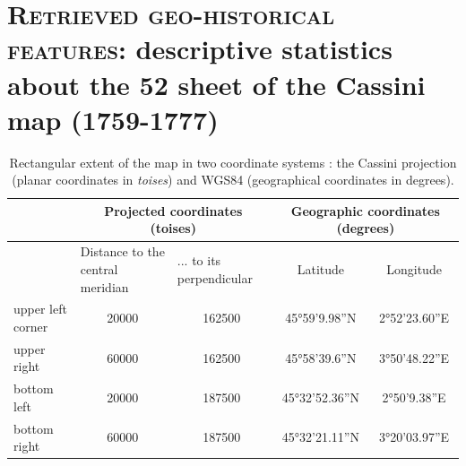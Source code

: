 \documentclass[portrait,a0]{sciposter}
\begin{document}
\vspace{-1cm}
\begin{minipage}[b]{\textwidth}
  \section{\normalfont \textsc{Retrieved geo-historical features}: descriptive statistics about the 52 sheet of the Cassini map (1759-1777)}
  \begin{multicols}{3}
    \setlength{\columnsep}{80pt}
    \footnotesize
    \begin{table}[]
      \begin{center}
        \captionsetup{type=table}
        \caption{Rectangular extent of the map in two coordinate systems : the Cassini projection (planar coordinates in \emph{toises}) and WGS84 (geographical coordinates in degrees).}
        \label{table:translation}
        \begin{tabular}{@{}lcccc@{}}
          \toprule
          & \multicolumn{2}{c}{Projected coordinates (toises)}                                                & \multicolumn{2}{c}{Geographic coordinates (degrees)}              \\
          \midrule
          & \multicolumn{1}{l}{Distance to the central meridian} & \multicolumn{1}{l}{... to its perpendicular} & \multicolumn{1}{c}{Latitude} & \multicolumn{1}{c}{Longitude} \\
          upper left corner & \num{20000}                                          & \num{162500}                                 & 45°59'9.98''N                & 2°52'23.60''E                 \\
          upper right       & \num{60000}                                          & \num{162500}                                 & 45°58'39.6''N                & 3°50'48.22''E                 \\
          bottom left      & \num{20000}                                        & \num{187500}                                & 45°32'52.36''N               & 2°50'9.38''E                  \\
          bottom right     & \num{60000}                                          & \num{187500}                                & 45°32'21.11''N               & 3°20'03.97''E                 \\
          \bottomrule
        \end{tabular}
      \end{center}
    \end{table}
    \vfill    
    

\end{multicols}
\end{minipage}
\end{document}
